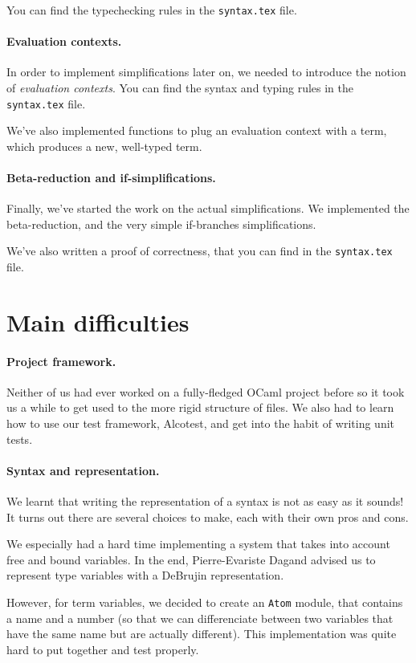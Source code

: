 \documentclass{article}
\begin{document}
You can find the typechecking rules in the {\tt syntax.tex} file.

\paragraph{Evaluation contexts.}In order to implement simplifications later on, we needed to 
introduce the notion of {\em evaluation contexts}. You can find the syntax and typing rules 
in the {\tt syntax.tex} file. 

We've also implemented functions to plug an evaluation context with a term, which produces a
new, well-typed term.

\paragraph{Beta-reduction and if-simplifications.}Finally, we've started the work on the 
actual simplifications. We implemented the beta-reduction, and the very simple if-branches
simplifications. 

We've also written a proof of correctness, that you can find in the {\tt syntax.tex} file.


\section{Main difficulties}
\paragraph{Project framework.}Neither of us had ever worked on a fully-fledged OCaml project before
so it took us a while to get used to the more rigid structure of files. We also had to learn how to use 
our test framework, Alcotest, and get into the habit of writing unit tests.

\paragraph{Syntax and representation.}We learnt that writing the representation of a syntax is not as easy as it sounds!
It turns out there are several choices to make, each with their own pros and cons. 

We especially had a hard time implementing a system that takes into account free and bound variables.
In the end, Pierre-Evariste Dagand advised us to represent type variables with a DeBrujin representation.

However, for term variables, we decided to create an {\tt Atom} module, that contains a name and a number (so that
we can differenciate between two variables that have the same name but are actually different).
This implementation was quite hard to put together and test properly.
\end{document}
